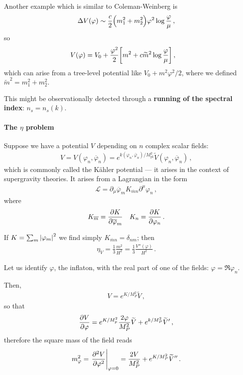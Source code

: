 \documentclass[main.tex]{subfiles}
\begin{document}
Another example which is similar to Coleman-Weinberg is  
%
\begin{align}
\Delta V(\varphi ) \sim \frac{c}{2} \qty(m_1^2+ m_2^2) \varphi^2 \log \frac{\varphi }{\mu }
\,,
\end{align}
%
so 
%
\begin{align}
V(\varphi ) &= V_0 + \frac{\varphi^2}{2} \qty[m^2 + c \widetilde{m}^2 \log \frac{\varphi }{\mu }]
\,,
\end{align}
%
which can arise from a tree-level potential like \(V_0 + m^2 \varphi^2 / 2\), where we defined \(\widetilde{m}^2 = m_1^2 + m_2^2\). 

This might be observationally detected through a \textbf{running of the spectral index}: \(n_s = n_s (k)\). 

\paragraph{The \(\eta \) problem}

Suppose we have a potential \(V\) depending on \(n\) complex scalar fields: 
%
\begin{align}
V = V(\varphi _n, \overline{\varphi} _n) = e^{k(\varphi _n, \overline{\varphi}_n) / M _{\text{pl}}^2} \widetilde{V} (\varphi _n, \overline{\varphi}_n)
\,,
\end{align}
%
which is commonly called the Kähler potential --- it arises in the context of supergravity theories. 
It arises from a Lagrangian in the form 
%
\begin{align}
\mathscr{L} = \partial_{\mu } \overline{\varphi}_{m} K_{\overline{m} n} \partial^{\mu } \varphi_n
\,,
\end{align}
%
where 
%
\begin{align}
K_{\overline{m}} = \pdv{K}{\overline{\varphi}_m} &&
K_{n} = \pdv{K}{\varphi_n} 
\,.
\end{align}

If \(K = \sum _{m} \abs{\varphi _m}^2\) we find simply \(K_{\overline{m} n} = \delta_{nm}\); then 
%
\begin{align}
\eta _V = \frac{1}{3} \frac{m^2}{H^2} = \frac{1}{3} \frac{V''(\varphi )}{H^2}
\,.
\end{align}

Let us identify \(\varphi \), the inflaton, with the real part of one of the fields: \(\varphi = \Re \varphi _n\).  

Then, 
%
\begin{align}
V = e^{K / M_P^2} \widetilde{V}
\,,
\end{align}
%
so that 
%
\begin{align}
\pdv{V}{\varphi } = e^{K / M_p^2} \frac{2 \varphi }{M_P^2} \widetilde{V} + e^{k / M_P^2} \widetilde{V}'
\,,
\end{align}
%
therefore the square mass of the field reads 
%
\begin{align}
m_\varphi^2
= \eval{\pdv[2]{V}{\varphi }}_{\varphi = 0} 
= \frac{2V}{M_P^2} + e^{K / M_P^2} \widetilde{V}''
\,.
\end{align}
\end{document}
